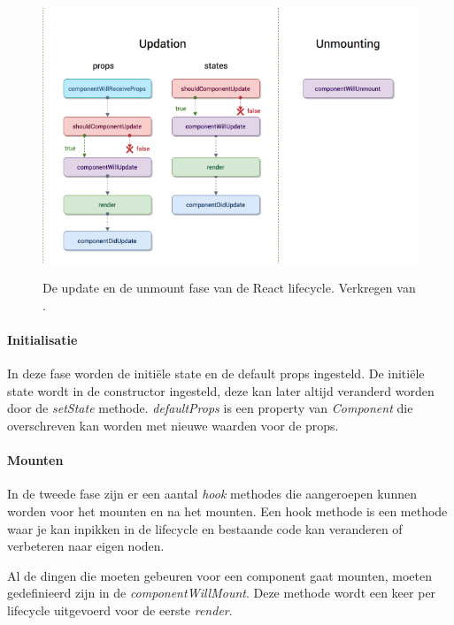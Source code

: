 \begin{figure}
	\begin{center}
		\caption{De update en de unmount fase van de React lifecycle. Verkregen van \textcite{reactlifecycle}.}
		\includegraphics[width=15cm]{img/react-lifecycle2}\\[0.5cm]
	\end{center}
\end{figure}

\paragraph{Initialisatie}
In deze fase worden de initiële state en de default props ingesteld. De initiële state wordt in de constructor ingesteld, deze kan later altijd veranderd worden door de \textit{setState} methode. \textit{defaultProps} is een property van \textit{Component} die overschreven kan worden met nieuwe waarden voor de props. 

\paragraph{Mounten}
In de tweede fase zijn er een aantal \textit{hook} methodes die aangeroepen kunnen worden voor het mounten en na het mounten. Een hook methode is een methode waar je kan inpikken in de lifecycle en bestaande code kan veranderen of verbeteren naar eigen noden. 

Al de dingen die moeten gebeuren voor een component gaat mounten, moeten gedefinieerd zijn in de \textit{componentWillMount}. Deze methode wordt een keer per lifecycle uitgevoerd voor de eerste \textit{render}. 

